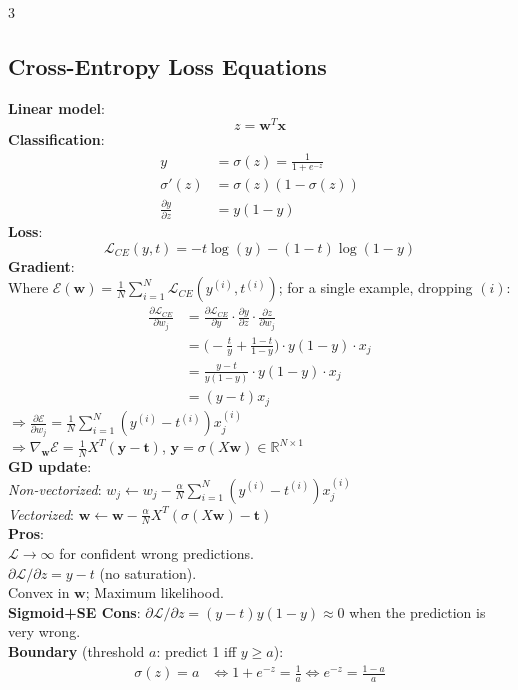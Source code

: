 \documentclass[10pt]{article}
\newcommand{\vx}{\mathbf{x}}
\newcommand{\vw}{\mathbf{w}}
\newcommand{\vt}{\mathbf{t}}
\newcommand{\cE}{\mathcal{E}}
\newcommand{\cL}{\mathcal{L}}
\newcommand{\sub}[1]{\textit{#1}:}  %
\begin{document}
\begin{multicols*}{3}
\subsection{Cross-Entropy Loss Equations}
\textbf{Linear model}:
\[ z = \vw^T\vx \]
\textbf{Classification}:
\begin{align*}
y &= \sigma(z) = \frac{1}{1+e^{-z}}\\
\sigma'(z) &= \sigma(z)\left(1-\sigma(z)\right)\\
\frac{\partial y}{\partial z} &= y(1-y)
\end{align*}
\textbf{Loss}:
\[ \cL_{CE}(y,t) = -t\log(y) - (1-t)\log(1-y) \]
\textbf{Gradient}:\\
Where $\cE(\vw) = \frac{1}{N}\sum_{i=1}^N \cL_{CE}\left(y^{(i)}, t^{(i)}\right)$; for a single example, dropping $(i)$:
\begin{align*}
\frac{\partial\cL_{CE}}{\partial w_j} &= \frac{\partial\cL_{CE}}{\partial y}\cdot\frac{\partial y}{\partial z}\cdot\frac{\partial z}{\partial w_j}\\
&= \Big(-\frac{t}{y}+\frac{1-t}{1-y}\Big)\cdot y(1-y)\cdot x_j\\
&= \frac{y-t}{y(1-y)}\cdot y(1-y)\cdot x_j\\
&= (y-t)x_j
\end{align*}
$\Rightarrow\frac{\partial\cE}{\partial w_j}=\frac1N\sum_{i=1}^N(y^{(i)}-t^{(i)})x_j^{(i)}$\\
$\Rightarrow\nabla_\vw\cE=\frac1NX^T(\mathbf y-\vt)$, $\mathbf y=\sigma(X\vw)\in\mathbb R^{N\times1}$\\
\textbf{GD update}:\\
\sub{Non-vectorized} $w_j\leftarrow w_j-\frac{\alpha}{N}\sum_{i=1}^N(y^{(i)}-t^{(i)})x_j^{(i)}$\\
\sub{Vectorized} $\vw\leftarrow\vw-\frac{\alpha}{N}X^T(\sigma(X\vw)-\vt)$\\
\textbf{Pros}:\\
$\cL\to\infty$ for confident wrong predictions.\\
$\partial\cL/\partial z=y-t$ (no saturation).\\
Convex in $\vw$; Maximum likelihood.\\
\textbf{Sigmoid+SE Cons}: $\partial\cL/\partial z=(y-t)y(1-y)\approx0$ when the prediction is very wrong.\\
\textbf{Boundary} (threshold $a$: predict 1 iff $y\ge a$):
\begin{align*}
\sigma(z)=a&\iff 1+e^{-z}=\tfrac1a\iff e^{-z}=\tfrac{1-a}{a}\\

\end{align*}
\end{multicols*}
\end{document}

